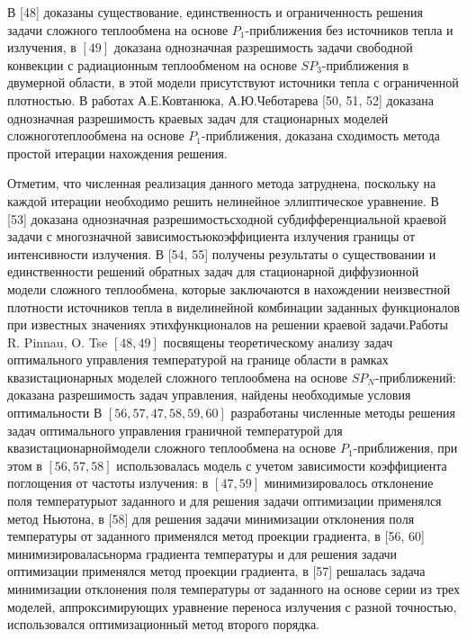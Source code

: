 \documentclass[10pt]{article}
\begin{document}
В [48] доказаны существование, единственность и ограниченность решения задачи сложного теплообмена на основе $P_{1}$-приближения без источников тепла и излучения, в $[49]$ доказана однозначная разрешимость задачи свободной конвекции с радиационным теплообменом на основе $S P_{3}$-приближения в двумерной области, в этой модели присутствуют источники тепла с ограниченной плотностью. В работах А.Е.Ковтанюка, А.Ю.Чеботарева [50, 51, 52] доказана однозначная разрешимость краевых задач для стационарных моделей сложноготеплообмена на основе $P_{1}$-приближения, доказана сходимость метода простой итерации нахождения решения.

Отметим, что численная реализация данного метода затруднена, поскольку на каждой итерации необходимо решить нелинейное эллиптическое уравнение. В [53] доказана однозначная разрешимостьсходной субдифференциальной краевой задачи с многозначной зависимостьюкоэффициента излучения границы от интенсивности излучения. В [54, 55] получены результаты о существовании и единственности решений обратных задач для стационарной диффузионной модели сложного теплообмена, которые заключаются в нахождении неизвестной плотности источников тепла в виделинейной комбинации заданных функционалов при известных значениях этихфункционалов на решении краевой задачи.Работы R. Pinnau, O. Tse $[48,49]$ посвящены теоретическому анализу задач оптимального управления температурой на границе области в рамках квазистационарных моделей сложного теплообмена на основе $S P_{N}$-приближений: доказана разрешимость задач управления, найдены необходимые условия оптимальности В $[56,57,47,58,59,60]$ разработаны численные методы решения задач оптимального управления граничной температурой для квазистационарноймодели сложного теплообмена на основе $P_{1}$-приближения, при этом в $[56,57,58]$ использовалась модель с учетом зависимости коэффициента поглощения от частоты излучения: в $[47,59]$ минимизировалось отклонение поля температурыот заданного и для решения задачи оптимизации применялся метод Ньютона, в [58] для решения задачи минимизации отклонения поля температуры от заданного применялся метод проекции градиента, в [56, 60] минимизироваласьнорма градиента температуры и для решения задачи оптимизации применялся метод проекции градиента, в [57] решалась задача минимизации отклонения поля температуры от заданного на основе серии из трех моделей, аппроксимирующих уравнение переноса излучения с разной точностью, использовался оптимизационный метод второго порядка.
\end{document}
